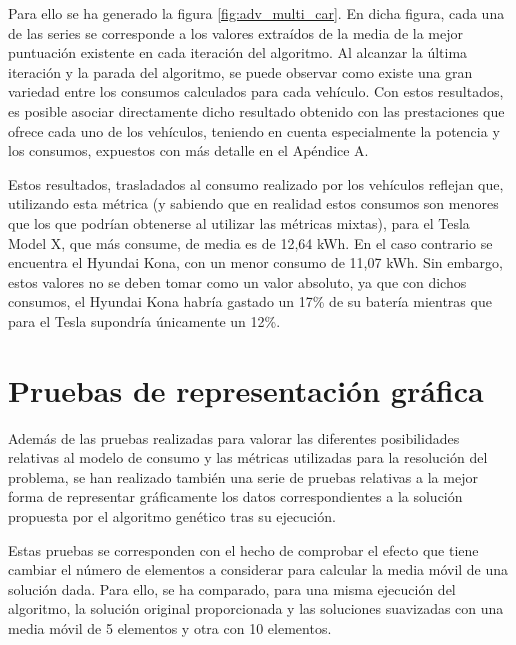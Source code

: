 \documentclass[11pt,spanish,listoffigures,listoftables]{tfgetsinf}
\begin{document}
Para ello se ha generado la figura \ref{fig:adv_multi_car}. En dicha figura, cada una de las series se corresponde a los valores extraídos de la media de la mejor puntuación existente en cada iteración del algoritmo. Al alcanzar la última iteración y la parada del algoritmo, se puede observar como existe una gran variedad entre los consumos calculados para cada vehículo. Con estos resultados, es posible asociar directamente dicho resultado obtenido con las prestaciones que ofrece cada uno de los vehículos, teniendo en cuenta especialmente la potencia y los consumos, expuestos con más detalle en el Apéndice A.

Estos resultados, trasladados al consumo realizado por los vehículos reflejan que, utilizando esta métrica (y sabiendo que en realidad estos consumos son menores que los que podrían obtenerse al utilizar las métricas mixtas), para el Tesla Model X, que más consume, de media es de 12,64 kWh. En el caso contrario se encuentra el Hyundai Kona, con un menor consumo de 11,07 kWh. Sin embargo, estos valores no se deben tomar como un valor absoluto, ya que con dichos consumos, el Hyundai Kona habría gastado un 17\% de su batería mientras que para el Tesla supondría únicamente un 12\%.

\newpage
\section{Pruebas de representación gráfica}
Además de las pruebas realizadas para valorar las diferentes posibilidades relativas al modelo de consumo y las métricas utilizadas para la resolución del problema, se han realizado también una serie de pruebas relativas a la mejor forma de representar gráficamente los datos correspondientes a la solución propuesta por el algoritmo genético tras su ejecución.

Estas pruebas se corresponden con el hecho de comprobar el efecto que tiene cambiar el número de elementos a considerar para calcular la media móvil de una solución dada. Para ello, se ha comparado, para una misma ejecución del algoritmo, la solución original proporcionada y las soluciones suavizadas con una media móvil de 5 elementos y otra con 10 elementos.
\end{document}

